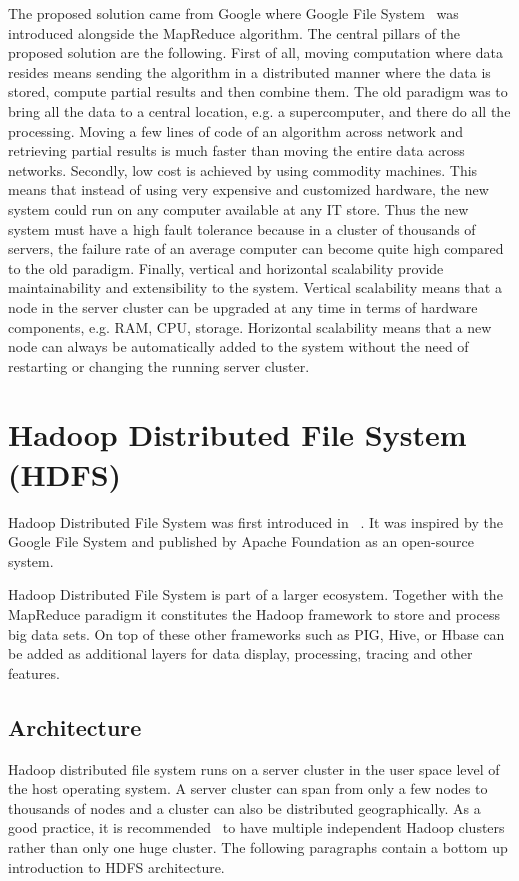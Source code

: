 \documentclass{sig-alternate}
\begin{document}
The proposed solution came from Google where Google File System~\cite{google1} was introduced alongside the MapReduce algorithm.
The central pillars of the proposed solution are the following.
First of all, moving computation where data resides means sending the algorithm in a distributed manner where the data is stored, compute partial results and then combine them. The old paradigm was to bring all the data to a central location, e.g. a supercomputer, and there do all the processing. Moving a few lines of code of an algorithm across network and retrieving partial results is much faster than moving the entire data across networks.
Secondly, low cost is achieved by using commodity machines. This means that instead of using very expensive and customized hardware, the new system could run on any computer available at any IT store. Thus the new system must have a high fault tolerance because in a cluster of thousands of servers, the failure rate of an average computer can become quite high compared to the old paradigm.
Finally, vertical and horizontal scalability provide maintainability and extensibility to the system. Vertical scalability means that a node in the server cluster can be upgraded at any time in terms of hardware components, e.g. RAM, CPU, storage. Horizontal scalability means that a new node can always be automatically added to the system without the need of restarting or changing the running server cluster.

\section{Hadoop Distributed File System (HDFS)}
Hadoop Distributed File System was first introduced in ~\cite{hadoop1}.
It was inspired by the Google File System and published by Apache Foundation as an open-source system.

Hadoop Distributed File System is part of a larger ecosystem.
Together with the MapReduce paradigm it constitutes the Hadoop framework to store and process big data sets. On top of these other frameworks such as PIG, Hive, or Hbase can be added as additional layers for data display, processing, tracing and other features. 

\subsection{Architecture}
Hadoop distributed file system runs on a server cluster in the user space level of the host operating system. A server cluster can span from only a few nodes to thousands of nodes and a cluster can also be distributed geographically. As a good practice, it is recommended~\cite{hadoop1} to have multiple independent Hadoop clusters rather than only one huge cluster. The following paragraphs contain a bottom up introduction to HDFS architecture. 
\end{document}
